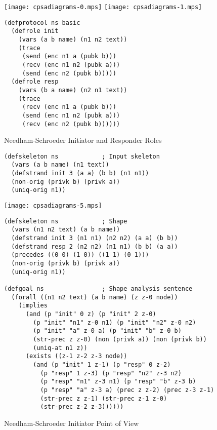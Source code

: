 \documentclass[12pt]{article}
\begin{document}
\begin{figure}
\begin{center}
\texttt{[image: cpsadiagrams-0.mps]}\hfil
\texttt{[image: cpsadiagrams-1.mps]}\\
\end{center}
\begin{center}
\begin{minipage}{3in}
\begin{verbatim}
(defprotocol ns basic
  (defrole init
    (vars (a b name) (n1 n2 text))
    (trace
     (send (enc n1 a (pubk b)))
     (recv (enc n1 n2 (pubk a)))
     (send (enc n2 (pubk b)))))
  (defrole resp
    (vars (b a name) (n2 n1 text))
    (trace
     (recv (enc n1 a (pubk b)))
     (send (enc n1 n2 (pubk a)))
     (recv (enc n2 (pubk b))))))
\end{verbatim}
\end{minipage}
\end{center}
\caption{Needham-Schroeder Initiator and Responder Roles}
\label{fig:ns roles}
\end{figure}

\begin{figure}
\begin{verbatim}
(defskeleton ns            ; Input skeleton
  (vars (a b name) (n1 text))
  (defstrand init 3 (a a) (b b) (n1 n1))
  (non-orig (privk b) (privk a))
  (uniq-orig n1))
\end{verbatim}
\begin{center}
\texttt{[image: cpsadiagrams-5.mps]}
\end{center}
\begin{verbatim}
(defskeleton ns            ; Shape
  (vars (n1 n2 text) (a b name))
  (defstrand init 3 (n1 n1) (n2 n2) (a a) (b b))
  (defstrand resp 2 (n2 n2) (n1 n1) (b b) (a a))
  (precedes ((0 0) (1 0)) ((1 1) (0 1)))
  (non-orig (privk b) (privk a))
  (uniq-orig n1))

(defgoal ns                ; Shape analysis sentence
  (forall ((n1 n2 text) (a b name) (z z-0 node))
    (implies
      (and (p "init" 0 z) (p "init" 2 z-0)
        (p "init" "n1" z-0 n1) (p "init" "n2" z-0 n2)
        (p "init" "a" z-0 a) (p "init" "b" z-0 b)
        (str-prec z z-0) (non (privk a)) (non (privk b))
        (uniq-at n1 z))
      (exists ((z-1 z-2 z-3 node))
        (and (p "init" 1 z-1) (p "resp" 0 z-2)
          (p "resp" 1 z-3) (p "resp" "n2" z-3 n2)
          (p "resp" "n1" z-3 n1) (p "resp" "b" z-3 b)
          (p "resp" "a" z-3 a) (prec z z-2) (prec z-3 z-1)
          (str-prec z z-1) (str-prec z-1 z-0)
          (str-prec z-2 z-3))))))
\end{verbatim}
\caption{Needham-Schroeder Initiator Point of View}
\label{fig:ns init}
\end{figure}
\end{document}
